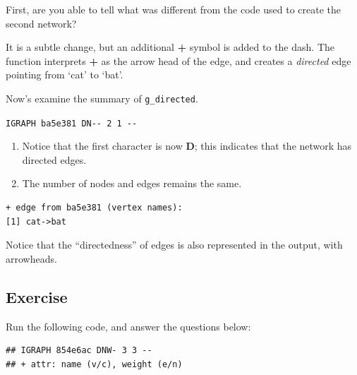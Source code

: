 \documentclass[
]{book}
\newenvironment{Shaded}{\begin{snugshade}}{\end{snugshade}}
\newcommand{\DecValTok}[1]{\textcolor[rgb]{0.00,0.00,0.81}{#1}}
\newcommand{\FunctionTok}[1]{\textcolor[rgb]{0.13,0.29,0.53}{\textbf{#1}}}
\newcommand{\NormalTok}[1]{#1}
\newcommand{\OtherTok}[1]{\textcolor[rgb]{0.56,0.35,0.01}{#1}}
\newcommand{\SpecialCharTok}[1]{\textcolor[rgb]{0.81,0.36,0.00}{\textbf{#1}}}
\providecommand{\tightlist}{%
  \setlength{\itemsep}{0pt}\setlength{\parskip}{0pt}}
\begin{document}
First, are you able to tell what was different from the code used to create the second network?

It is a subtle change, but an additional \textbf{+} symbol is added to the dash. The function interprets \textbf{+} as the arrow head of the edge, and creates a \emph{directed} edge pointing from `cat' to `bat'.

Now's examine the summary of \texttt{g\_directed}.

\texttt{IGRAPH\ ba5e381\ DN-\/-\ 2\ 1\ -\/-}

\begin{enumerate}
\def\labelenumi{\arabic{enumi}.}
\tightlist
\item
  Notice that the first character is now \textbf{D}; this indicates that the network has directed edges.
\item
  The number of nodes and edges remains the same.
\end{enumerate}

\begin{verbatim}
+ edge from ba5e381 (vertex names):
[1] cat->bat
\end{verbatim}

Notice that the ``directedness'' of edges is also represented in the output, with arrowheads.

\subsection{Exercise}\label{exercise-1}

Run the following code, and answer the questions below:

\begin{Shaded}
\end{Shaded}

\begin{verbatim}
## IGRAPH 854e6ac DNW- 3 3 -- 
## + attr: name (v/c), weight (e/n)
\end{verbatim}
\end{document}
